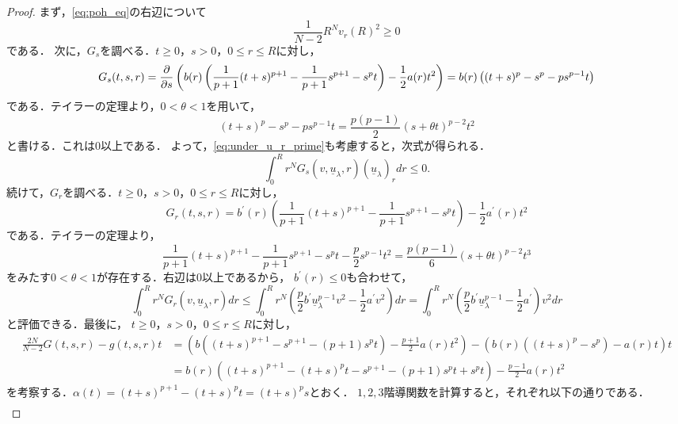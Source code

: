 \begin{proof}
 まず，\eqref{eq:poh_eq}の右辺について
 \begin{equation}
  \frac{1}{N-2} R^N v_r(R)^2 \geq 0 \label{eq:poh_ineq_0}
 \end{equation}
 である．
 次に，$G_s$を調べる．$t \geq 0 $，$s > 0$，$0 \leq r \leq R$に対し，
 \[
  G_s(t, s, r) = \frac{\partial }{\partial s} \left( b(r) \left( \frac{1}{p+1}
 (t+s)^{p+1} - \frac{1}{p+1}s^{p+1} - s^pt \right)
 - \frac{1}{2}a(r) t^2 \right) = b(r) \left( (t+s)^p - s^p -p s^{p-1}
 t \right)
 \]
 である．テイラーの定理より，$0 < \theta < 1$を用いて，
 \[
  (t+s)^p - s^p - ps^{p-1} t = \frac{p(p-1)}{2} (s + \theta t)^{p-2} t^2
 \]
 と書ける．これは$0$以上である．
 よって，\eqref{eq:under_u_r_prime}も考慮すると，次式が得られる．
 \begin{equation}
  \int_0^R r^N G_s(v, \underline{u}_\lambda, r)
   (\underline{u}_\lambda)_r dr \leq 0. \label{eq:poh_ineq_1}
 \end{equation}
 続けて，$G_r$を調べる．$t \geq 0 $，$s > 0$，$0 \leq r \leq R$に対し，
 \[
  G_r(t, s, r) = b^\prime(r) \left( \frac{1}{p+1} (t+s)^{p+1} -
 \frac{1}{p+1} s^{p+1} - s^{p} t \right) - \frac{1}{2} a^\prime(r) t^2
 \]
 である．テイラーの定理より，
 \[
  \frac{1}{p+1} (t+s)^{p+1} - \frac{1}{p+1} s^{p+1} -s^p t -
 \frac{p}{2} s^{p-1} t^2 = \frac{p(p-1)}{6} (s + \theta t)^{p-2} t^3
 \]
 をみたす$0 < \theta < 1$が存在する．右辺は$0$以上であるから，
 $b^\prime(r) \leq 0$も合わせて，
 \begin{equation}
  \int_0^R r^N G_r(v, \underline{u}_\lambda, r) dr \leq \int_0^R
   r^N \left( \frac{p}{2} b^\prime \underline{u}_\lambda^{p-1} v^2 -
    \frac{1}{2} a^\prime v^2 \right)dr = 
   \int_0^R r^N \left( \frac{p}{2} b^\prime \underline{u}_\lambda^{p-1} -
    \frac{1}{2} a^\prime \right) v^2 dr \label{eq:poh_ineq_2} 
 \end{equation}
 と評価できる．最後に，
 $t \geq 0 $，$s > 0$，$0 \leq r \leq R$に対し，
 \begin{align*}
  \frac{2N}{N-2}G(t, s, r) - g(t, s, r)t 
  &= \left( b \left( (t+s)^{p+1} - s^{p+1} - (p+1)s^p t \right) -
  \frac{p+1}{2} a(r) t^2 \right) - \left( b(r) \left( (t+s)^p - s^p
  \right) - a(r) t \right) t \\
  &= b(r) \left( (t+s)^{p+1} - (t+s)^p t - s^{p+1} - (p+1)s^p t + s^p
  t \right) -\frac{p-1}{2} a(r) t^2
 \end{align*}
 を考察する．$\alpha(t) = (t+s)^{p+1} - (t+s)^p t = (t+s)^p s$とおく．
 $1, 2, 3$階導関数を計算すると，それぞれ以下の通りである．
 \begin{align*}

\end{align*}
\end{proof}
